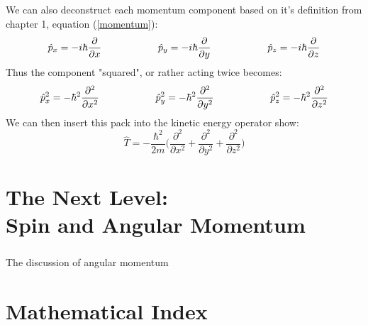 \documentclass[12pt,letterpaper]{book}
\begin{document}
\paragraph*{}We can also deconstruct each momentum component based on it's definition from chapter 1, equation (\ref{momentum}):
\begin{equation}
\label{momentum cartesian}
\hat{p}_x = -i\hbar \frac{\partial}{\partial x} \text{\hspace*{2cm}}
\hat{p}_y = -i\hbar \frac{\partial}{\partial y} \text{\hspace*{2cm}}
\hat{p}_z = -i\hbar \frac{\partial}{\partial z}
\end{equation}
Thus the component "squared", or rather acting twice becomes:
\begin{equation}
\label{momentum sq cartesian}
\hat{p}_x^2 = -\hbar^2 \frac{\partial^2}{\partial x^2} \text{\hspace*{2cm}}
\hat{p}_y^2 = -\hbar^2 \frac{\partial^2}{\partial y^2} \text{\hspace*{2cm}}
\hat{p}_z^2 = -\hbar^2 \frac{\partial^2}{\partial z^2}
\end{equation}
We can then insert this pack into the kinetic energy operator show:
\begin{equation}
\hat{T} = -\frac{\hbar^2}{2m}\big( \frac{\partial^2}{\partial x^2} + \frac{\partial^2}{\partial y^2} + \frac{\partial^2}{\partial z^2} \big)

\end{equation}


\chapter{The Next Level: \\ Spin and Angular Momentum}
\paragraph*{}The discussion of angular momentum 


\chapter{Mathematical Index}
\end{document}
